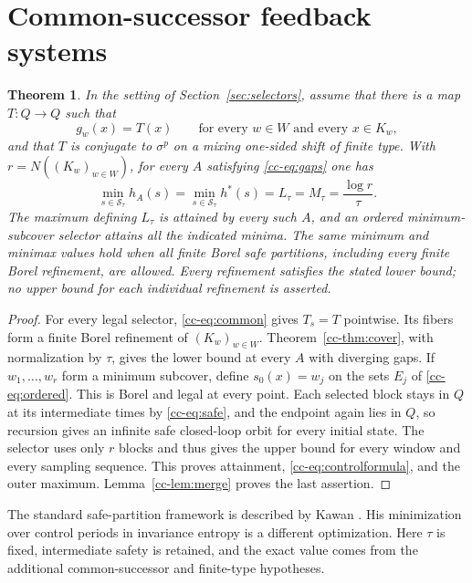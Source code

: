 \documentclass[11pt,reqno]{amsart}
\numberwithin{equation}{section}
\newtheorem{theorem}{Theorem}[section]
\theoremstyle{definition}
\newcommand{\hpat}{h^{*}}
\newcommand{\Ssafe}{\mathcal S}
\begin{document}
\section{Common-successor feedback systems}\label{sec:common-successor}

\begin{theorem}\label{cc-thm:control}
In the setting of Section~\ref{sec:selectors}, assume that there is
a map $T:Q\to Q$ such that
\begin{equation}\label{cc-eq:common}
 g_w(x)=T(x)\qquad\text{for every }w\in W\text{ and every }x\in K_w,
\end{equation}
and that $T$ is conjugate to $\sigma^p$ on a mixing one-sided shift of
finite type. With $r=N((K_w)_{w\in W})$, for every $A$ satisfying
\eqref{cc-eq:gaps} one has
\begin{equation}\label{cc-eq:controlformula}
 \min_{s\in\Ssafe_\tau}h_A(s)
 =\min_{s\in\Ssafe_\tau}\hpat(s)
 =L_\tau=M_\tau=\frac{\log r}{\tau}.
\end{equation}
The maximum defining $L_\tau$ is attained by every such $A$, and an
ordered minimum-subcover selector attains all the indicated minima.
The same minimum and minimax values hold when all finite Borel safe
partitions, including every finite Borel refinement, are allowed. Every
refinement satisfies the stated lower bound; no upper bound for each
individual refinement is asserted.
\end{theorem}
\begin{proof}
For every legal selector, \eqref{cc-eq:common} gives $T_s=T$ pointwise.
Its fibers form a finite Borel refinement of $(K_w)_{w\in W}$.
Theorem~\ref{cc-thm:cover}, with normalization by $\tau$, gives the lower
bound at every $A$ with diverging gaps. If $w_1,\ldots,w_r$ form a
minimum subcover, define $s_0(x)=w_j$ on the sets $E_j$ of
\eqref{cc-eq:ordered}. This is Borel and legal at every point. Each selected
block stays in $Q$ at its intermediate times by \eqref{cc-eq:safe}, and
the endpoint again lies in $Q$, so recursion gives an infinite safe
closed-loop orbit for every initial state. The selector uses only $r$
blocks and thus gives the upper bound for every window and every
sampling sequence. This proves attainment, \eqref{cc-eq:controlformula},
and the outer maximum. Lemma~\ref{cc-lem:merge} proves the last assertion.
\end{proof}

The standard safe-partition framework is described by Kawan
\cite[Chapter~2]{Kawan2013}. His minimization over control periods in
invariance entropy is a different optimization. Here $\tau$ is fixed,
intermediate safety is retained, and the exact value comes from the
additional common-successor and finite-type hypotheses.
\end{document}
